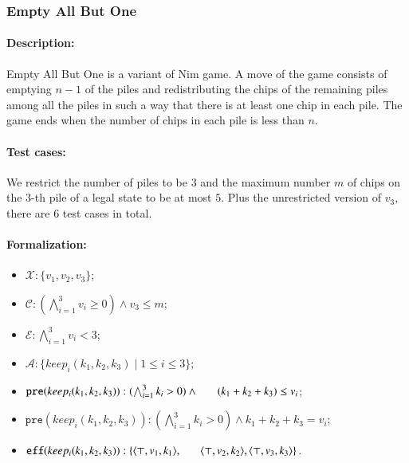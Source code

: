 \documentclass[review]{elsarticle}
\newcommand{\set}[1]{\{ #1 \}}
\newcommand{\tuple}[1]{\langle {#1} \rangle}
\newcommand{\true}{\top}
\newcommand{\statevar}{\mathcal{X}}
\newcommand{\act}{\mathcal{A}}
\newcommand{\constraint}{\mathcal{C}}
\newcommand{\estate}{\mathcal{E}}
\newcommand{\pre}{\mathtt{pre}}
\newcommand{\eff}{\mathtt{eff}}
\begin{document}
\subsubsection{Empty All But One \protect\cite{Fer1998}}
\paragraph{Description:}
Empty All But One is a variant of Nim game.
A move of the game consists of emptying $n - 1$ of the piles and redistributing the chips of the remaining piles among all the piles in such a way that there is at least one chip in each pile.
The game ends when the number of chips in each pile is less than $n$. 

\paragraph{Test cases:}
We restrict the number of piles to be $3$ and the maximum number $m$ of chips on the $3$-th pile of a legal state to be at most $5$. 
Plus the unrestricted version of $v_3$, there are $6$ test cases in total.

\paragraph{Formalization:}

\begin{itemize}
	\item $\statevar: \set{v_1, v_2, v_3}$;
	\item $\constraint: (\bigwedge_{i=1}^{3} v_i \ge 0) \wedge v_3 \le m$;
	\item $\estate: \bigwedge_{i=1}^{3} v_i < 3$;
	
	\item $\act:\set{keep_i(k_1, k_2, k_3){\mid}1\le i \le 3}$;
	\item $\pre(keep_i(k_1, k_2, k_3)) : (\bigwedge_{i=1}^{3} k_i > 0) \wedge \\ \hspace*{6mm}
	(k_1 + k_2 +k_3)\le v_i $;
	\item {\color{red}$\pre(keep_i(k_1, k_2, k_3)) : (\bigwedge_{i=1}^{3} k_i > 0) \wedge k_1 + k_2 + k_3 = v_i$;}
	\item $\eff(keep_i(k_1, k_2, k_3)) : \set{\tuple{\true, v_1, k_1}, \\ \hspace*{6mm}
		\tuple{\true, v_2, k_2},\tuple{\true, v_3, k_3}}$.
	
	
\end{itemize}
\end{document}
